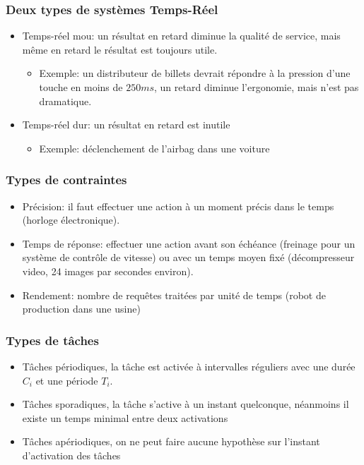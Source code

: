 \documentclass[ignorenonframetext,]{beamer}
\begin{document}
\begin{frame}\frametitle{Deux types de systèmes Temps-Réel}

\begin{itemize}
\item
  Temps-réel mou: un résultat en retard diminue la qualité de service,
  mais même en retard le résultat est toujours utile.

  \begin{itemize}
  \item
    Exemple: un distributeur de billets devrait répondre à la pression
    d'une touche en moins de $250 ms$, un retard diminue l'ergonomie,
    mais n'est pas dramatique.
  \end{itemize}
\item
  Temps-réel dur: un résultat en retard est inutile

  \begin{itemize}
  \item
    Exemple: déclenchement de l'airbag dans une voiture
  \end{itemize}
\end{itemize}

\end{frame}

\begin{frame}\frametitle{Types de contraintes}

\begin{itemize}
\item
  Précision: il faut effectuer une action à un moment précis dans le
  temps (horloge électronique).
\item
  Temps de réponse: effectuer une action avant son échéance (freinage
  pour un système de contrôle de vitesse) ou avec un temps moyen fixé
  (décompresseur video, 24 images par secondes environ).
\item
  Rendement: nombre de requêtes traitées par unité de temps (robot de
  production dans une usine)
\end{itemize}

\end{frame}

\begin{frame}\frametitle{Types de tâches}

\begin{itemize}
\item
  Tâches périodiques, la tâche est activée à intervalles réguliers avec
  une durée $C_i$ et une période $T_i$.
\item
  Tâches sporadiques, la tâche s'active à un instant quelconque,
  néanmoins il existe un temps minimal entre deux activations
\item
  Tâches apériodiques, on ne peut faire aucune hypothèse sur l'instant
  d'activation des tâches
\end{itemize}

\end{frame}
\end{document}
